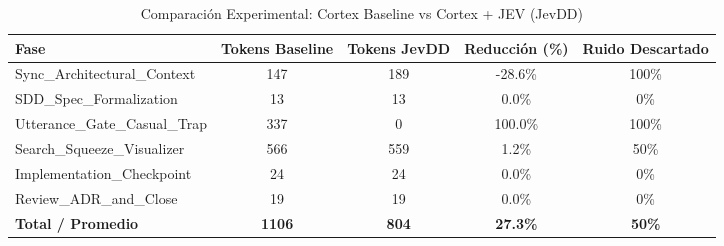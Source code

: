 \begin{table}[ht]
\centering
\caption{Comparación Experimental: Cortex Baseline vs Cortex + JEV (JevDD)}
\label{tab:conaisi_results}
\begin{tabular}{lcccc}
\hline
\textbf{Fase} & \textbf{Tokens Baseline} & \textbf{Tokens JevDD} & \textbf{Reducción (\%)} & \textbf{Ruido Descartado} \\ \hline
Sync_Architectural_Context & 147 & 189 & -28.6\% & 100\% \\
SDD_Spec_Formalization & 13 & 13 & 0.0\% & 0\% \\
Utterance_Gate_Casual_Trap & 337 & 0 & 100.0\% & 100\% \\
Search_Squeeze_Visualizer & 566 & 559 & 1.2\% & 50\% \\
Implementation_Checkpoint & 24 & 24 & 0.0\% & 0\% \\
Review_ADR_and_Close & 19 & 19 & 0.0\% & 0\% \\
\hline
\textbf{Total / Promedio} & \textbf{1106} & \textbf{804} & \textbf{27.3\%} & \textbf{50\%} \\ \hline
\end{tabular}
\end{table}
